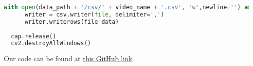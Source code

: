\begin{lstlisting}[language=python, showstringspaces=false,frame=single]
  with open(data_path + '/csv/' + video_name + '.csv', 'w',newline='') as file:
      writer = csv.writer(file, delimiter=',')
      writer.writerows(file_data) 
    
  cap.release()
  cv2.destroyAllWindows()

\end{lstlisting}

Our code can be found at \href{https://github.com/habib-university/Kaavish-Template}{this GitHub link}.

